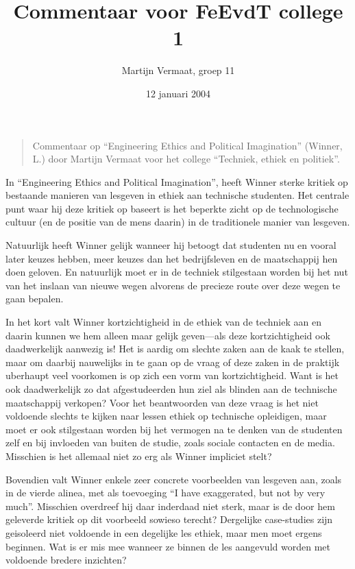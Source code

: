 \documentclass[11pt]{article}
\title{Commentaar voor FeEvdT college 1}
\author{
    Martijn Vermaat, groep 11
}
\date{12 januari 2004}
\begin{document}
\maketitle

\begin{quote}
Commentaar op ``Engineering Ethics and Political Imagination'' (Winner, L.)
door Martijn Vermaat voor het college ``Techniek, ethiek en politiek''.
\end{quote}

In ``Engineering Ethics and Political Imagination'', heeft Winner sterke
kritiek op bestaande manieren van lesgeven in ethiek aan technische studenten.
Het centrale punt waar hij deze kritiek op baseert is het beperkte zicht op de
technologische cultuur (en de positie van de mens daarin) in de traditionele
manier van lesgeven.

Natuurlijk heeft Winner gelijk wanneer hij betoogt dat studenten nu en vooral
later keuzes hebben, meer keuzes dan het bedrijfsleven en de maatschappij hen
doen geloven. En natuurlijk moet er in de techniek stilgestaan worden bij het
nut van het inslaan van nieuwe wegen alvorens de precieze route over deze
wegen te gaan bepalen.

In het kort valt Winner kortzichtigheid in de ethiek van de techniek aan en
daarin kunnen we hem alleen maar gelijk geven---als deze kortzichtigheid ook
daadwerkelijk aanwezig is! Het is aardig om slechte zaken aan de kaak te
stellen, maar om daarbij nauwelijks in te gaan op de vraag of deze zaken in de
praktijk uberhaupt veel voorkomen is op zich een vorm van kortzichtigheid.
Want is het ook daadwerkelijk zo dat afgestudeerden hun ziel als blinden aan
de technische maatschappij verkopen? Voor het beantwoorden van deze vraag is
het niet voldoende slechts te kijken naar lessen ethiek op technische
opleidigen, maar moet er ook stilgestaan worden bij het vermogen na te denken
van de studenten zelf en bij invloeden van buiten de studie, zoals sociale
contacten en de media. Misschien is het allemaal niet zo erg als Winner
impliciet stelt?

Bovendien valt Winner enkele zeer concrete voorbeelden van lesgeven aan, zoals
in de vierde alinea, met als toevoeging ``I have exaggerated, but not by very
much''. Misschien overdreef hij daar inderdaad niet sterk, maar is de door hem
geleverde kritiek op dit voorbeeld sowieso terecht? Dergelijke case-studies
zijn geisoleerd niet voldoende in een degelijke les ethiek, maar men moet
ergens beginnen. Wat is er mis mee wanneer ze binnen de les aangevuld worden
met voldoende bredere inzichten?
\end{document}
